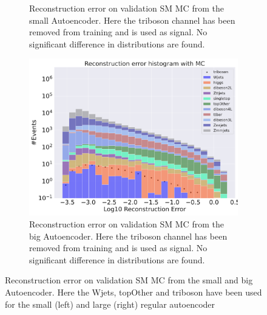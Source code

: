 \begin{figure}[H]
\begin{subfigure}{.45\textwidth}
        \caption{Reconstruction error on validation SM MC from the small Autoencoder. Here the triboson channel has been removed from training and 
        is used as signal. No significant difference in distributions are found. }
        \label{fig:ae_small_triboson}
    \end{subfigure}
    \hfill 
    \begin{subfigure}{.45\textwidth}
        \includegraphics[width=\textwidth]{Figures/AE_testing/big/b_data_recon_big_rm3_feats_sig_triboson.pdf}
        \caption{Reconstruction error on validation SM MC from the big Autoencoder. Here the triboson channel has been removed from training and 
        is used as signal. No significant difference in distributions are found. }
        \label{fig:ae_big_triboson}
    \end{subfigure}
    \hfill  
    \caption[AE | Channel removal, Wjets, topOther, triboson]{Reconstruction error on validation SM MC from the small and big Autoencoder. 
    Here the Wjets, topOther and triboson have been used for the small (left) and large (right) regular autoencoder}
    \label{fig:ae_big_channel4}
\end{figure}

